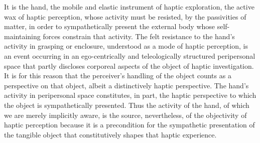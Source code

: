 It is the hand, the mobile and elastic instrument of haptic exploration, the active wax of haptic perception, whose activity must be resisted, by the passivities of matter, in order to sympathetically present the external body whose self-maintaining forces constrain that activity. The felt resistance to the hand's activity in grasping or enclosure, understood as a mode of haptic perception, is an event occurring in an ego-centrically and teleologically structured peripersonal space that partly discloses corporeal aspects of the object of haptic investigation. It is for this reason that the perceiver's handling of the object counts as a perspective on that object, albeit a distinctively haptic perspective. The hand's activity in peripersonal space constitutes, in part, the haptic perspective to which the object is sympathetically presented. Thus the activity of the hand, of which we are merely implicitly aware, is the source, nevertheless, of the objectivity of haptic perception because it is a precondition for the sympathetic presentation of the tangible object that constitutively shapes that haptic experience.



